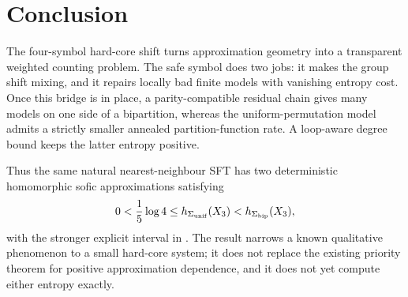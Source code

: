 \section{Conclusion}

The four-symbol hard-core shift turns approximation geometry into a transparent
weighted counting problem.  The safe symbol does two jobs: it makes the group
shift mixing, and it repairs locally bad finite models with vanishing entropy
cost.  Once this bridge is in place, a parity-compatible residual chain gives
many models on one side of a bipartition, whereas the uniform-permutation
model admits a strictly smaller annealed partition-function rate.  A
loop-aware degree bound keeps the latter entropy positive.

Thus the same natural nearest-neighbour SFT has two deterministic homomorphic
sofic approximations satisfying
\[
 0<\frac15\log4
 \le h_{\Sigma_{\mathrm{unif}}}(X_3)
 < h_{\Sigma_{\mathrm{bip}}}(X_3),
\]
with the stronger explicit interval in .  The result narrows a
known qualitative phenomenon to a small hard-core system; it does not replace
the existing priority theorem for positive approximation dependence, and it
does not yet compute either entropy exactly.

